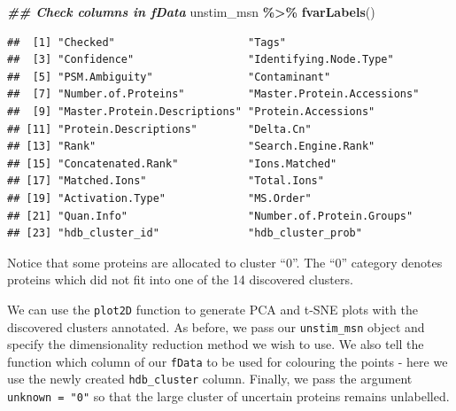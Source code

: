 \documentclass[9pt,a4paper,]{extarticle}
\newenvironment{Shaded}{\begin{snugshade}}{\end{snugshade}}
\newcommand{\DocumentationTok}[1]{\textcolor[rgb]{0.56,0.35,0.01}{\textbf{\textit{#1}}}}
\newcommand{\FunctionTok}[1]{\textcolor[rgb]{0.13,0.29,0.53}{\textbf{#1}}}
\newcommand{\NormalTok}[1]{#1}
\newcommand{\SpecialCharTok}[1]{\textcolor[rgb]{0.81,0.36,0.00}{\textbf{#1}}}
\begin{document}
\begin{Shaded}
\begin{Highlighting}[]
\DocumentationTok{\#\# Check columns in fData}
\NormalTok{unstim\_msn }\SpecialCharTok{\%\textgreater{}\%} 
  \FunctionTok{fvarLabels}\NormalTok{()}
\end{Highlighting}
\end{Shaded}

\begin{verbatim}
##  [1] "Checked"                     "Tags"                       
##  [3] "Confidence"                  "Identifying.Node.Type"      
##  [5] "PSM.Ambiguity"               "Contaminant"                
##  [7] "Number.of.Proteins"          "Master.Protein.Accessions"  
##  [9] "Master.Protein.Descriptions" "Protein.Accessions"         
## [11] "Protein.Descriptions"        "Delta.Cn"                   
## [13] "Rank"                        "Search.Engine.Rank"         
## [15] "Concatenated.Rank"           "Ions.Matched"               
## [17] "Matched.Ions"                "Total.Ions"                 
## [19] "Activation.Type"             "MS.Order"                   
## [21] "Quan.Info"                   "Number.of.Protein.Groups"   
## [23] "hdb_cluster_id"              "hdb_cluster_prob"
\end{verbatim}

Notice that some proteins are allocated to cluster ``0''. The ``0'' category
denotes proteins which did not fit into one of the 14 discovered clusters.

We can use the \texttt{plot2D} function to generate PCA and t-SNE plots with the
discovered clusters annotated. As before, we pass our \texttt{unstim\_msn} object and
specify the dimensionality reduction method we wish to use. We also tell the
function which column of our \texttt{fData} to be used for colouring the points - here
we use the newly created \texttt{hdb\_cluster} column. Finally, we pass the argument
\texttt{unknown\ =\ "0"} so that the large cluster of uncertain proteins remains
unlabelled.
\end{document}
